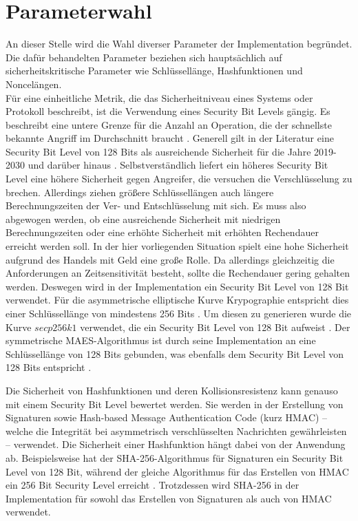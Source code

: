 \documentclass[
	fontsize=11pt,
	headings=small,
	parskip=half,           %
	bibliography=totoc,
	numbers=noenddot,       %
	open=any,               %
]{scrreprt}
\begin{document}
\section{Parameterwahl}
An dieser Stelle wird die Wahl diverser Parameter der Implementation begründet. Die dafür behandelten Parameter beziehen sich hauptsächlich auf sicherheitskritische Parameter wie Schlüssellänge, Hashfunktionen und Noncelängen.\\
Für eine einheitliche Metrik, die das Sicherheitniveau eines Systems oder Protokoll beschreibt, ist die Verwendung eines Security Bit Levels gängig. Es beschreibt eine untere Grenze für die Anzahl an Operation, die der schnellste bekannte Angriff im Durchschnitt braucht \cite{ecc-hankerson2021nist}. Generell gilt in der Literatur eine Security Bit Level von 128 Bits als ausreichende Sicherheit für die Jahre 2019-2030 und darüber hinaus \cite{elaine2016recommendation}. Selbstverständlich liefert ein höheres Security Bit Level eine höhere Sicherheit gegen Angreifer, die versuchen die Verschlüsselung zu brechen. Allerdings ziehen größere Schlüssellängen auch längere Berechnungszeiten der Ver- und Entschlüsselung mit sich. Es muss also abgewogen werden, ob eine ausreichende Sicherheit mit niedrigen Berechnungszeiten oder eine erhöhte Sicherheit mit erhöhten Rechendauer erreicht werden soll. In der hier vorliegenden Situation spielt eine hohe Sicherheit aufgrund des Handels mit Geld eine große Rolle. Da allerdings gleichzeitig die Anforderungen an Zeitsensitivität besteht, sollte die Rechendauer gering gehalten werden. Deswegen wird in der Implementation ein Security Bit Level von 128 Bit verwendet. Für die asymmetrische elliptische Kurve Krypographie entspricht dies einer Schlüssellänge von mindestens 256 Bits \cite{elaine2016recommendation,bsi2020cryptographic}. Um diesen zu generieren wurde die Kurve $secp256k1$ verwendet, die ein Security Bit Level von 128 Bit aufweist \cite{ecc-duka2020elliptic}. Der symmetrische MAES-Algorithmus ist durch seine Implementation an eine Schlüssellänge von 128 Bits gebunden, was ebenfalls dem Security Bit Level von 128 Bits entspricht \cite{elaine2016recommendation}.

Die Sicherheit von Hashfunktionen und deren Kollisionsresistenz kann genauso mit einem Security Bit Level bewertet werden. Sie werden in der Erstellung von Signaturen sowie Hash-based Message Authentication Code (kurz HMAC) -- welche die Integrität bei asymmetrisch verschlüsselten Nachrichten gewährleisten -- verwendet. Die Sicherheit einer Hashfunktion hängt dabei von der Anwendung ab. Beispielsweise hat der SHA-256-Algorithmus für Signaturen ein Security Bit Level von 128 Bit, während der gleiche Algorithmus für das Erstellen von HMAC ein 256 Bit Security Level erreicht \cite{elaine2016recommendation}. Trotzdessen wird SHA-256 in der Implementation für sowohl das Erstellen von Signaturen als auch von HMAC verwendet.
\end{document}
